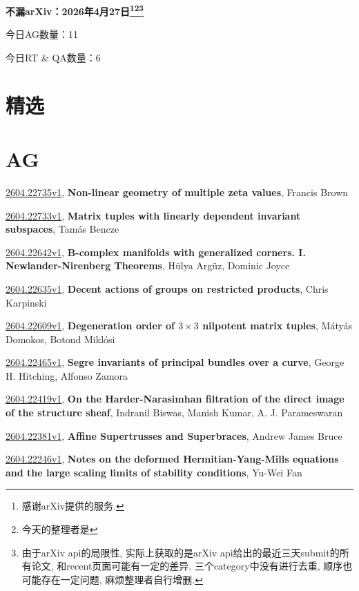 \documentclass[9pt, a4paper]{article}
\theoremstyle{plain}
\theoremstyle{definition}
\theoremstyle{remark}
\newcommand{\arxiv}[3]{\href{https://arxiv.org/abs/#1}{#1}, \textbf{\textcolor{arxivblue}{#2}}, #3}
\newcommand{\AGnumber}{11}
\newcommand{\RTQAnumber}{6}
\newcommand{\NewestDate}{2026年4月27日}
\newcommand{\todayarXiver}{} %
\begin{document}
\begin{center}
    \Huge\textbf{不漏arXiv：\NewestDate\footnote{感谢arXiv提供的服务.}\footnote{今天的整理者是\todayarXiver}\footnote{由于arXiv api的局限性, 实际上获取的是arXiv api给出的最近三天submit的所有论文, 和recent页面可能有一定的差异. 三个category中没有进行去重, 顺序也可能存在一定问题, 麻烦整理者自行增删.}} \\
\end{center}

\setcounter{section}{-1}

\begin{center}
    今日AG数量：\AGnumber
    
    今日RT \& QA数量：\RTQAnumber
    
\end{center}


\section{精选}


\section{AG}
\arxiv{2604.22735v1}{Non-linear geometry of multiple zeta values}{Francis Brown}

\arxiv{2604.22733v1}{Matrix tuples with linearly dependent invariant subspaces}{Tamás Bencze}

\arxiv{2604.22642v1}{B-complex manifolds with generalized corners. I. Newlander-Nirenberg Theorems}{Hülya Argüz, Dominic Joyce}

\arxiv{2604.22635v1}{Decent actions of groups on restricted products}{Chris Karpinski}

\arxiv{2604.22609v1}{Degeneration order of $3\times 3$ nilpotent matrix tuples}{Mátyás Domokos, Botond Miklósi}

\arxiv{2604.22465v1}{Segre invariants of principal bundles over a curve}{George H. Hitching, Alfonso Zamora}

\arxiv{2604.22419v1}{On the Harder-Narasimhan filtration of the direct image of the structure sheaf}{Indranil Biswas, Manish Kumar, A. J. Parameswaran}

\arxiv{2604.22381v1}{Affine Supertrusses and Superbraces}{Andrew James Bruce}

\arxiv{2604.22246v1}{Notes on the deformed Hermitian-Yang-Mills equations and the large scaling limits of stability conditions}{Yu-Wei Fan}
\end{document}
